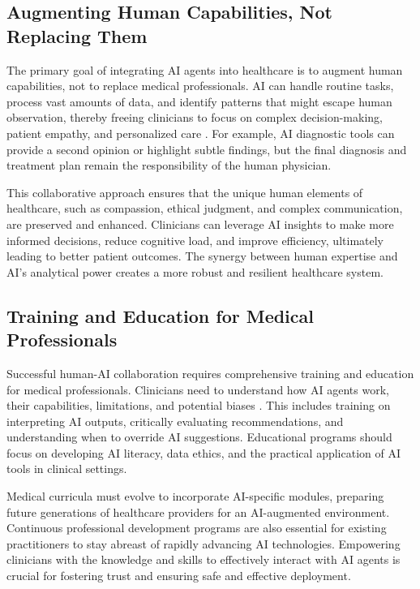 \documentclass[12pt,a4paper]{article}
\begin{document}
\subsection{Augmenting Human Capabilities, Not Replacing Them}
\label{subsec:augmenting-capabilities}
The primary goal of integrating AI agents into healthcare is to augment human capabilities, not to replace medical professionals. AI can handle routine tasks, process vast amounts of data, and identify patterns that might escape human observation, thereby freeing clinicians to focus on complex decision-making, patient empathy, and personalized care \cite{davenport2019ai}. For example, AI diagnostic tools can provide a second opinion or highlight subtle findings, but the final diagnosis and treatment plan remain the responsibility of the human physician.

This collaborative approach ensures that the unique human elements of healthcare, such as compassion, ethical judgment, and complex communication, are preserved and enhanced. Clinicians can leverage AI insights to make more informed decisions, reduce cognitive load, and improve efficiency, ultimately leading to better patient outcomes. The synergy between human expertise and AI's analytical power creates a more robust and resilient healthcare system.

\subsection{Training and Education for Medical Professionals}
\label{subsec:training-education}
Successful human-AI collaboration requires comprehensive training and education for medical professionals. Clinicians need to understand how AI agents work, their capabilities, limitations, and potential biases \cite{relias_healthcare_lms}. This includes training on interpreting AI outputs, critically evaluating recommendations, and understanding when to override AI suggestions. Educational programs should focus on developing AI literacy, data ethics, and the practical application of AI tools in clinical settings.

Medical curricula must evolve to incorporate AI-specific modules, preparing future generations of healthcare providers for an AI-augmented environment. Continuous professional development programs are also essential for existing practitioners to stay abreast of rapidly advancing AI technologies. Empowering clinicians with the knowledge and skills to effectively interact with AI agents is crucial for fostering trust and ensuring safe and effective deployment.
\end{document}
